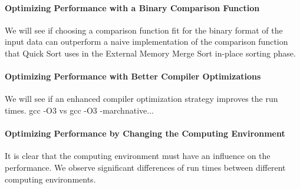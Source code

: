 \documentclass[twocolumn]{article}
\begin{document}
\paragraph*{Optimizing Performance with a Binary Comparison Function}
We will see if choosing a comparison function fit for the binary format of the input data can outperform a naive implementation of the comparison function that Quick Sort uses
in the External Memory Merge Sort in-place sorting phase.

\paragraph*{Optimizing Performance with Better Compiler Optimizations}
We will see if an enhanced compiler optimization strategy improves the run times.
gcc -O3 vs gcc -O3 -marchnative...

\paragraph*{Optimizing Performance by Changing the Computing Environment}
It is clear that the computing environment must have an influence on the performance.
We observe significant differences of run times between different computing environments.
\end{document}

